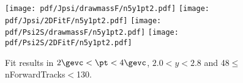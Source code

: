 \begin{figure}[H]
\begin{center}
\texttt{[image: pdf/Jpsi/drawmassF/n5y1pt2.pdf]}
\texttt{[image: pdf/Jpsi/2DFitF/n5y1pt2.pdf]}
\vspace*{-0.5cm}
\texttt{[image: pdf/Psi2S/drawmassF/n5y1pt2.pdf]}
\texttt{[image: pdf/Psi2S/2DFitF/n5y1pt2.pdf]}
\vspace*{-0.5cm}
\end{center}
\caption{Fit results in $2\gevc<\pt<4\gevc$, $2.0<y<2.8$ and 48$\leq$nForwardTracks$<$130.}
\label{Fitn5y1pt2}
\end{figure}
